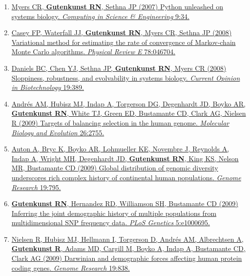 \documentclass[11pt]{article}
\begin{document}
\begin{enumerate}
\item \href{http://doi.org/10.1109/MCSE.2007.60}{\grad Myers CR, \textbf{Gutenkunst RN}, Sethna JP (2007) {Python unleashed on systems
  biology}.
\newblock \emph{Computing in Science \& Engineering} 9:34.}


\item \href{http://doi.org/10.1103/PhysRevE.78.046704}{\grad Casey FP\corresponding, Waterfall JJ, \textbf{Gutenkunst RN}, Myers CR, Sethna JP (2008) {Variational method for estimating the rate of convergence of Markov-chain Monte Carlo algorithms}.
\newblock \emph{Physical Review E} 78:046704.}


\item \href{http://doi.org/10.1016/j.copbio.2008.06.008}{\grad Daniels BC, Chen YJ, Sethna JP\corresponding, \textbf{Gutenkunst RN}, Myers CR (2008) {Sloppiness,
  robustness, and evolvability in systems biology}.
\newblock \emph{Current Opinion in Biotechnology} 19:389.}


\item \href{http://doi.org/10.1093/molbev/msp190}{Andr\'{e}s AM\corresponding, Hubisz MJ, Indap A, Torgerson DG, Degenhardt JD, Boyko AR,
  \textbf{Gutenkunst RN}, White TJ, Green ED, Bustamante CD, Clark AG, Nielsen R (2009)
  {Targets of balancing selection in the human genome}.
\newblock \emph{Molecular Biology and Evolution} 26:2755.}

\item
\href{http://doi.org/10.1101/gr.088898.108}{Auton A, Bryc K, Boyko AR, Lohmueller KE, Novembre J, Reynolds A, Indap A,
  Wright MH, Degenhardt JD, \textbf{Gutenkunst RN}, King KS, Nelson MR, Bustamante CD\corresponding
  (2009) {Global distribution of genomic diversity underscores rich complex
  history of continental human populations.}
\newblock \emph{Genome Research} 19:795.}

\item
\href{http://doi.org/10.1371/journal.pgen.1000695}{\textbf{Gutenkunst RN}\corresponding, Hernandez RD, Williamson SH, Bustamante CD (2009) {Inferring the
  joint demographic history of multiple populations from multidimensional SNP
  frequency data}.
\newblock \emph{PLoS Genetics} 5:e1000695.}

\item
\href{http://doi.org/10.1101/gr.088336.108}{Nielsen R\corresponding, Hubisz MJ, Hellmann I, Torgerson D, Andr\'{e}s AM, Albrechtsen A,
  \textbf{Gutenkunst R}, Adams MD, Cargill M, Boyko A, Indap A, Bustamante CD, Clark AG
  (2009) {Darwinian and demographic forces affecting human protein coding
  genes}.
\newblock \emph{Genome Research} 19:838.}




\end{enumerate}
\end{document}
